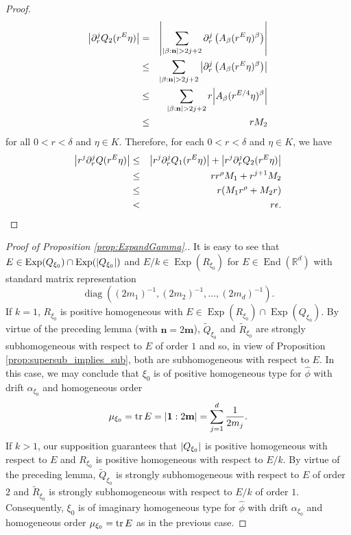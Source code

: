 \documentclass[11pt, letter]{book}
\newcommand\End{\operatorname{End}} %
\newcommand\Exp{\operatorname{Exp}}
\newcommand\diag{\operatorname{diag}}
\newcommand{\lp}{\left(}
\newcommand{\rp}{\right)}
\begin{document}
\begin{proof}
\begin{eqnarray*}
    \abs{\partial_r^jQ_2(r^E\eta)}&=&\abs{\sum_{|\beta:\mathbf{n}|> 2j+2}\partial_r^j\lp A_\beta(r^E\eta)^\beta\rp}\\
    &\leq & \sum_{|\beta:\mathbf{n}|>2j+2}\abs{\partial_r^j\lp A_\beta(r^E\eta)^\beta\rp}\\
    &\leq&\sum_{|\beta:\mathbf{n}|>2j+2}r\abs{A_\beta(r^{E/4}\eta)^\beta}\\
    &\leq &rM_2
\end{eqnarray*}
for all $0<r<\delta$ and $\eta\in K$. Therefore, for each $0<r<\delta$ and $\eta\in K$, we have
\begin{eqnarray*}
    \abs{r^j\partial_r^jQ(r^E\eta)}&\leq&\abs{r^j\partial_r^jQ_1(r^E\eta)}+\abs{r^j\partial_r^jQ_2(r^E\eta)}\\
    &\leq& rr^\rho M_1+r^{j+1}M_2\\
    &\leq& r(M_1r^\rho+M_2r)\\
    &<&r \epsilon.
\end{eqnarray*}
\end{proof}

\begin{proof}[Proof of Proposition \ref{prop:ExpandGamma}.]
It is easy to see that $E\in \Exp(Q_{\xi_0})\cap\Exp(\abs{Q_{\xi_0}})$ and $E/k\in\Exp(R_{\xi_0})$ for $E\in\End(\mathbb{R}^d)$ with standard matrix representation 
\begin{equation*}
\diag((2m_1)^{-1}, (2m_2)^{-1},\dots, (2m_d)^{-1}).
\end{equation*}
If $k=1$, $R_{\xi_0}$ is positive homogeneous with $E\in\Exp(R_{\xi_0})\cap\Exp(Q_{\xi_0})$. By virtue of the preceding lemma (with $\mathbf{n}=2\mathbf{m}$), $\widetilde{Q}_{\xi_0}$ and $\widetilde{R}_{\xi_0}$ are strongly subhomogeneous with respect to $E$ of order $1$ and so, in view of Proposition \ref{prop:supersub_implies_sub}, both are subhomogeneous with respect to $E$. In this case, we may conclude that $\xi_0$ is of positive homogeneous type for $\widehat{\phi}$ with drift $\alpha_{\xi_0}$ and homogeneous order
\begin{equation*}
    \mu_{\xi_0}=\tr E=|\mathbf{1}:2\mathbf{m}|=\sum_{j=1}^d\frac{1}{2m_j}.
\end{equation*}
If $k>1$, our supposition guarantees that $\abs{Q_{\xi_0}}$ is positive homogeneous with respect to $E$ and $R_{\xi_0}$ is positive homogeneous with respect to $E/k$. By virtue of the preceding lemma, $\widetilde{Q}_{\xi_0}$ is strongly subhomogeneous with respect to $E$ of order $2$ and $\widetilde{R}_{\xi_0}$ is strongly subhomogeneous with respect to $E/k$ of order $1$. Consequently, $\xi_0$ is of imaginary homogeneous type for $\widehat{\phi}$ with drift $\alpha_{\xi_0}$ and homogeneous order $\mu_{\xi_0}=\tr E$ as in the previous case.
\end{proof}
\end{document}

